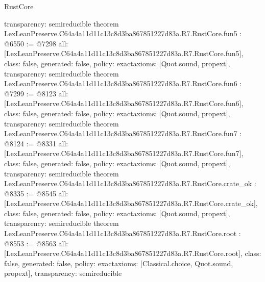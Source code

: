 \begin{lexlean}{RustCore}
\begin{coremodule}
{  transparency: semireducible
}
theorem LexLeanPreserve.C64a4a11d11c13c8d3ba867851227d83a.R7.RustCore.fun5 : @6550 := @7298 {
  all: [LexLeanPreserve.C64a4a11d11c13c8d3ba867851227d83a.R7.RustCore.fun5],
  class: false,
  generated: false,
  policy: exact{axioms: [Quot.sound, propext]},
  transparency: semireducible
}
theorem LexLeanPreserve.C64a4a11d11c13c8d3ba867851227d83a.R7.RustCore.fun6 : @7299 := @8123 {
  all: [LexLeanPreserve.C64a4a11d11c13c8d3ba867851227d83a.R7.RustCore.fun6],
  class: false,
  generated: false,
  policy: exact{axioms: [Quot.sound, propext]},
  transparency: semireducible
}
theorem LexLeanPreserve.C64a4a11d11c13c8d3ba867851227d83a.R7.RustCore.fun7 : @8124 := @8331 {
  all: [LexLeanPreserve.C64a4a11d11c13c8d3ba867851227d83a.R7.RustCore.fun7],
  class: false,
  generated: false,
  policy: exact{axioms: [Quot.sound, propext]},
  transparency: semireducible
}
theorem LexLeanPreserve.C64a4a11d11c13c8d3ba867851227d83a.R7.RustCore.crate_ok : @8335 := @8545 {
  all: [LexLeanPreserve.C64a4a11d11c13c8d3ba867851227d83a.R7.RustCore.crate_ok],
  class: false,
  generated: false,
  policy: exact{axioms: [Quot.sound, propext]},
  transparency: semireducible
}
theorem LexLeanPreserve.C64a4a11d11c13c8d3ba867851227d83a.R7.RustCore.root : @8553 := @8563 {
  all: [LexLeanPreserve.C64a4a11d11c13c8d3ba867851227d83a.R7.RustCore.root],
  class: false,
  generated: false,
  policy: exact{axioms: [Classical.choice, Quot.sound, propext]},
  transparency: semireducible
}


\end{coremodule}
\end{lexlean}
